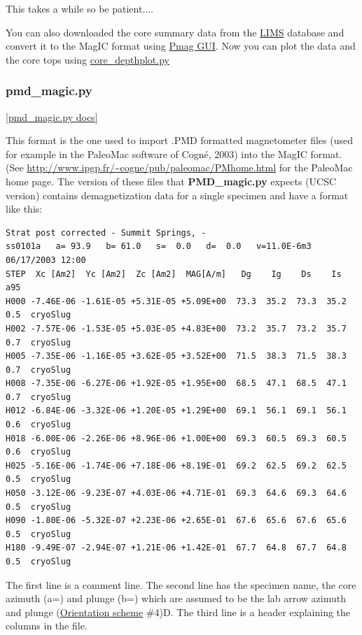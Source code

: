 \documentclass[11pt]{book}
\begin{document}
{{{{This takes a while so be patient....

You can also downloaded the {core summary} data from the \href{#LIMS} {LIMS} database and convert it to the MagIC format using \href{#pmag_gui.py}{Pmag GUI}.
Now you can plot the data and the core tops using \href{#core_depthplot.py}{core\_depthplot.py}



\subsubsection{pmd\_magic.py}
\href{https://github.com/PmagPy/PmagPy/blob/master/programs/pmd_magic.py}{[pmd\_magic.py docs]}

This format is the one used to import  .PMD formatted magnetometer files (used for example in the PaleoMac software of Cogn\'e, 2003) \nocite{cogne03} into the MagIC format.  (See \url{http://www.ipgp.fr/~cogne/pub/paleomac/PMhome.html} for the PaleoMac home page.
The version of these files that {\bf PMD\_magic.py} expects (UCSC version) contains demagnetization data for a single specimen and have a format like this:

\begin{verbatim}
Strat post corrected - Summit Springs, -
ss0101a   a= 93.9   b= 61.0   s=  0.0   d=  0.0   v=11.0E-6m3  06/17/2003 12:00
STEP  Xc [Am2]  Yc [Am2]  Zc [Am2]  MAG[A/m]   Dg    Ig    Ds    Is  a95
H000 -7.46E-06 -1.61E-05 +5.31E-05 +5.09E+00  73.3  35.2  73.3  35.2  0.5  cryoSlug
H002 -7.57E-06 -1.53E-05 +5.03E-05 +4.83E+00  73.2  35.7  73.2  35.7  0.7  cryoSlug
H005 -7.35E-06 -1.16E-05 +3.62E-05 +3.52E+00  71.5  38.3  71.5  38.3  0.7  cryoSlug
H008 -7.35E-06 -6.27E-06 +1.92E-05 +1.95E+00  68.5  47.1  68.5  47.1  0.7  cryoSlug
H012 -6.84E-06 -3.32E-06 +1.20E-05 +1.29E+00  69.1  56.1  69.1  56.1  0.6  cryoSlug
H018 -6.00E-06 -2.26E-06 +8.96E-06 +1.00E+00  69.3  60.5  69.3  60.5  0.6  cryoSlug
H025 -5.16E-06 -1.74E-06 +7.18E-06 +8.19E-01  69.2  62.5  69.2  62.5  0.5  cryoSlug
H050 -3.12E-06 -9.23E-07 +4.03E-06 +4.71E-01  69.3  64.6  69.3  64.6  0.5  cryoSlug
H090 -1.80E-06 -5.32E-07 +2.23E-06 +2.65E-01  67.6  65.6  67.6  65.6  0.5  cryoSlug
H180 -9.49E-07 -2.94E-07 +1.21E-06 +1.42E-01  67.7  64.8  67.7  64.8  0.5  cryoSlug
\end{verbatim}

The first line is a comment line.  The second line has the specimen name, the core azimuth (a=) and plunge (b=) which are assumed to be the lab arrow azimuth and plunge (\href{#orientation_schemes}{Orientation scheme} \#4)D.   The third line is a header explaining the columns in the file.


}}}}
\end{document}

